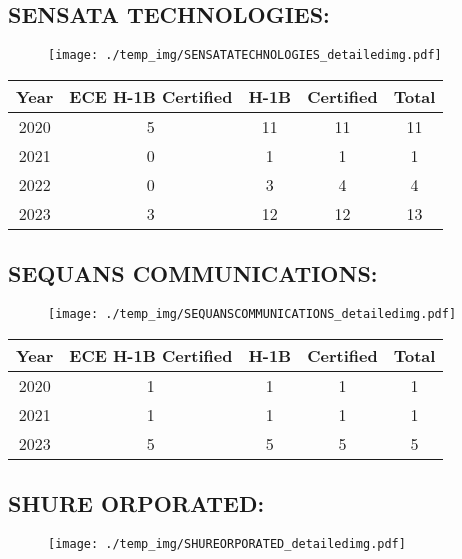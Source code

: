 \documentclass{article}%
\begin{document}
%
\newpage%
\subsection{SENSATA TECHNOLOGIES:}%
\label{subsec:SENSATATECHNOLOGIES}%
\label{SENSATATECHNOLOGIESdetailed}%


\begin{figure}[htbp]%
\centering%
\texttt{[image: ./temp\_img/SENSATATECHNOLOGIES\_detailedimg.pdf]}%
\end{figure}

%
\begin{longtable}{c|c|c|c|c}%
\hline%
Year&ECE H{-}1B Certified&H{-}1B&Certified&Total\\%
\hline%
2020&5&11&11&11\\%
\hline%
2021&0&1&1&1\\%
\hline%
2022&0&3&4&4\\%
\hline%
2023&3&12&12&13\\%
\hline%
\end{longtable}

%
\newpage%
\subsection{SEQUANS COMMUNICATIONS:}%
\label{subsec:SEQUANSCOMMUNICATIONS}%
\label{SEQUANSCOMMUNICATIONSdetailed}%


\begin{figure}[htbp]%
\centering%
\texttt{[image: ./temp\_img/SEQUANSCOMMUNICATIONS\_detailedimg.pdf]}%
\end{figure}

%
\begin{longtable}{c|c|c|c|c}%
\hline%
Year&ECE H{-}1B Certified&H{-}1B&Certified&Total\\%
\hline%
2020&1&1&1&1\\%
\hline%
2021&1&1&1&1\\%
\hline%
2023&5&5&5&5\\%
\hline%
\end{longtable}

%
\newpage%
\subsection{SHURE ORPORATED:}%
\label{subsec:SHUREORPORATED}%
\label{SHUREORPORATEDdetailed}%


\begin{figure}[htbp]%
\centering%
\texttt{[image: ./temp\_img/SHUREORPORATED\_detailedimg.pdf]}%
\end{figure}
\end{document}
